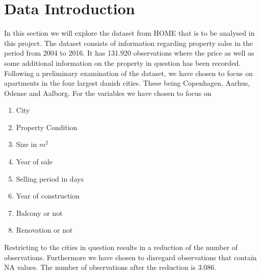 \section{Data Introduction}
In this section we will explore the dataset from HOME that is to be analysed in this project.
The dataset consists of information regarding property sales in the period from 2004 to 2016.
It has 131.920 observations where the price as well as some additional information on the property in question has been recorded.
Following a preliminary examination of the dataset, we have chosen to focus on apartments in the four largest danish cities. 
These being Copenhagen, Aarhus, Odense and Aalborg.
For the variables we have chosen to focus on
\begin{enumerate}
    \item City
    \item Property Condition
    \item Size in $m^2$
    \item Year of sale
    \item Selling period in days
    \item Year of construction
    \item Balcony or not
    \item Renovation or not
\end{enumerate}
Restricting to the cities in question results in a reduction of the number of observations.
Furthermore we have chosen to disregard observations that contain NA values.
The number of observations after the reduction is 3.086.

